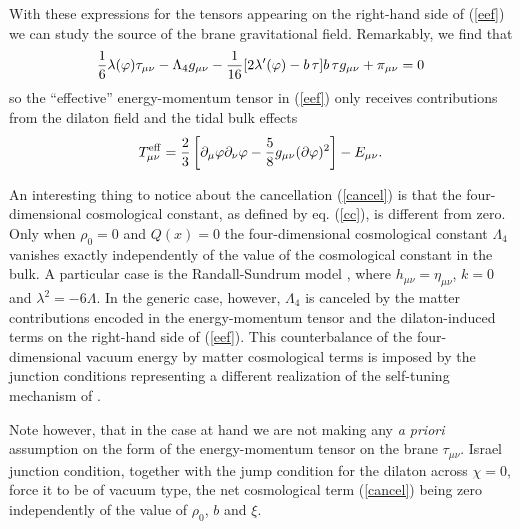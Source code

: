 \documentclass[prd,a4paper,twocolumn,superscriptaddress,nofootinbib,showpacs]{revtex4}
\begin{document}
With these expressions for the tensors appearing on the right-hand side of (\ref{eef}) we can study the 
source of the brane gravitational field. Remarkably, we find that
\begin{equation}
{1\over 6}\lambda(\varphi)\tau_{\mu\nu}-\Lambda_{4}g_{\mu\nu}-{1\over 16}[2\lambda'(\varphi)-b\,\tau]b\,\tau
g_{\mu\nu}+\pi_{\mu\nu}=0
\label{cancel}
\end{equation}
so the ``effective'' energy-momentum tensor in (\ref{eef}) only receives contributions from the dilaton field
and the tidal bulk effects
$$
T_{\mu\nu}^{\rm eff}= {2\over 3}\left[\partial_{\mu}\varphi\partial_{\nu}\varphi-{5\over 8} g_{\mu\nu}
(\partial\varphi)^2\right]-E_{\mu\nu}.
$$

An interesting thing to notice about the cancellation (\ref{cancel}) is that the 
four-dimensional cosmological constant, as defined by eq. (\ref{cc}), is different from zero. 
Only when $\rho_{0}=0$ and $Q(x)=0$ the four-dimensional cosmological constant $\Lambda_{4}$
vanishes exactly independently of the value of the cosmological constant in the bulk.
A particular case is the Randall-Sundrum model \cite{rs}, where
$h_{\mu\nu}=\eta_{\mu\nu}$, $k=0$ and $\lambda^2= -6\Lambda$.
In the generic case, however, $\Lambda_{4}$ is canceled by the matter contributions encoded 
in the energy-momentum tensor and the dilaton-induced terms on the right-hand side of (\ref{eef}). 
This counterbalance of the four-dimensional vacuum energy by matter cosmological
terms is imposed by the junction conditions representing a different realization of
the self-tuning mechanism of \cite{kach,kachh}. 

Note however, that in the case at hand we are not making any {\it a priori} assumption on the
form of the energy-momentum tensor on the brane $\tau_{\mu\nu}$. Israel junction
condition, together with the jump condition for the dilaton across $\chi=0$,
force it to be of vacuum type, the net cosmological term (\ref{cancel}) being zero 
independently of the value of $\rho_{0}$, $b$ and $\xi$. 
\end{document}
